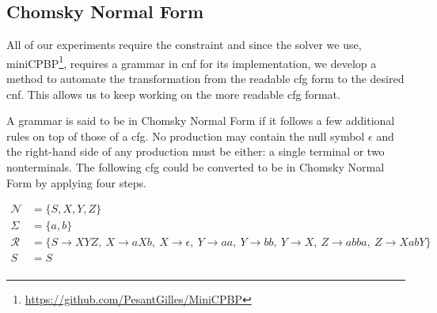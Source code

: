 \documentclass[../Document.tex]{subfiles}
\begin{document}
\subsection{Chomsky Normal Form}
All of our experiments require the \grammar constraint and since the solver we use, miniCPBP\footnote{\url{https://github.com/PesantGilles/MiniCPBP}}, requires a grammar in \gls{cnf} for its implementation, we develop a method to automate the transformation from the readable \gls{cfg} form to the desired \gls{cnf}. This allows us to keep working on the more readable \gls{cfg} format.

A grammar is said to be in Chomsky Normal Form if it follows a few additional rules on top of those of a \gls{cfg}. No production may contain the null symbol $\epsilon$ and the right-hand side of any production must be either: a single terminal or two nonterminals. The following \gls{cfg} could be converted to be in Chomsky Normal Form by applying four steps.

\begin{align*}
    \mathcal{N} &= \{S,X,Y,Z\}\\
    \Sigma &= \{a,b\}\\
    \mathcal{R} &= \{ S \rightarrow XYZ ,\  X \rightarrow aXb ,\  X \rightarrow \epsilon ,\  Y \rightarrow aa ,\   Y \rightarrow bb ,\ Y \rightarrow X ,\ Z \rightarrow abba ,\ Z \rightarrow XabY \}\\
    S &= S\\
\end{align*}
\end{document}

